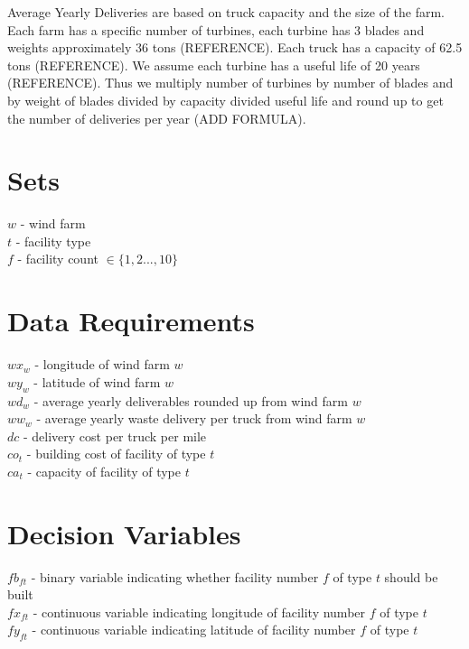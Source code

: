 \documentclass[11pt, oneside]{article}   	%
\begin{document}
Average Yearly Deliveries are based on truck capacity and the size of the farm. Each farm has a specific number of turbines, each turbine has 3 blades and weights approximately 36 tons (REFERENCE). Each truck has a capacity of 62.5 tons (REFERENCE). We assume each turbine has a useful life of 20 years (REFERENCE). Thus we multiply number of turbines by number of blades and by weight of blades divided by capacity divided useful life and round up to get the number of deliveries per year (ADD FORMULA).


\section*{Sets}
$w$ - wind farm \\
$t$ - facility type \\
$f$ - facility count $ \in \{1,2...,10 \} $ \\ 


\section*{Data Requirements}
$wx_{w}$ - longitude of wind farm $w$ \\
$wy_{w}$ - latitude of wind farm $w$ \\
$wd_{w}$ - average yearly deliverables rounded up from wind farm $w$ \\ 
$ww_{w}$ - average yearly waste delivery per truck from wind farm $w$ \\ 
$dc$ - delivery cost per truck per mile \\ 
$co_{t}$ - building cost of facility of type $t$ \\
$ca_{t}$ - capacity of facility of type $t$ \\


\section*{Decision Variables} 
$fb_{ft}$ - binary variable indicating whether facility number $f$ of type $t$ should be built \\
$fx_{ft}$ - continuous variable indicating longitude of facility number $f$ of type $t$ \\
$fy_{ft}$ - continuous variable indicating latitude of facility number $f$ of type $t$ 
\end{document}
